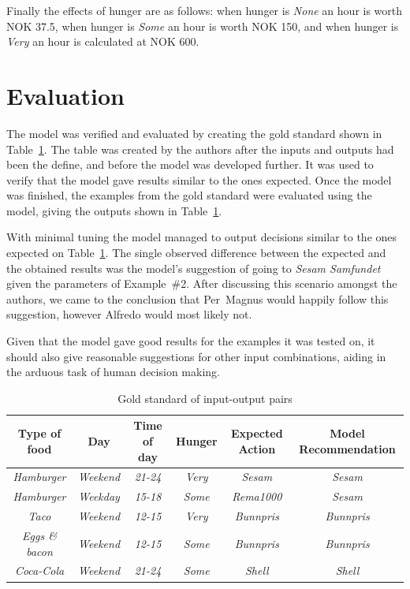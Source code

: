 Finally the effects of hunger are as follows: when hunger is \textit{None} an hour is worth NOK 37.5, when hunger is \textit{Some} an hour is worth NOK 150, and when hunger is \textit{Very} an hour is calculated at NOK 600.

\section{Evaluation}

The model was verified and evaluated by creating the gold standard shown in Table~\ref{table:evaluation}. The table was created by the authors after the inputs and outputs had been the define, and before the model was developed further. It was used to verify that the model gave results similar to the ones expected. Once the model was finished, the examples from the gold standard were evaluated using the model, giving the outputs shown in Table~\ref{table:evaluation}.

With minimal tuning the model managed to output decisions similar to the ones expected on Table~\ref{table:evaluation}. The single observed difference between the expected and the obtained results was the model's suggestion of going to \textit{Sesam Samfundet} given the parameters of Example~\#2. After discussing this scenario amongst the authors, we came to the conclusion that Per~Magnus would happily follow this suggestion, however Alfredo would most likely not.

Given that the model gave good results for the examples it was tested on, it should also give reasonable suggestions for other input combinations, aiding in the arduous task of human decision making.

\begin{table}
{\footnotesize
\centering
\begin{tabular}{cccccc}
\toprule
Type of food & Day & Time of day & Hunger & Expected Action & Model Recommendation \\
\midrule
\textit{Hamburger}     & \textit{Weekend} & \textit{21-24} & \textit{Very} & \textit{Sesam}    & \textit{Sesam} \\
\textit{Hamburger}     & \textit{Weekday} & \textit{15-18} & \textit{Some} & \textit{Rema1000} & \textit{Sesam} \\
\textit{Taco}          & \textit{Weekend} & \textit{12-15} & \textit{Very} & \textit{Bunnpris} & \textit{Bunnpris} \\
\textit{Eggs \& bacon} & \textit{Weekend} & \textit{12-15} & \textit{Some} & \textit{Bunnpris} & \textit{Bunnpris} \\
\textit{Coca-Cola}     & \textit{Weekend} & \textit{21-24} & \textit{Some} & \textit{Shell}    & \textit{Shell} \\
\bottomrule
\end{tabular}
\caption{Gold standard of input-output pairs}
\label{table:evaluation}
}
\end{table}





